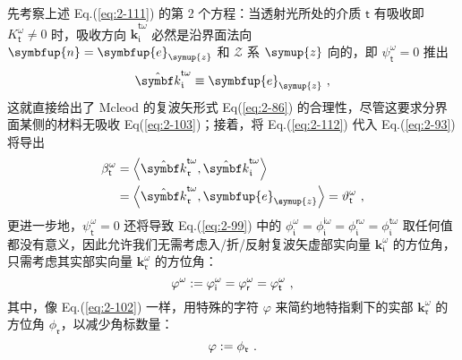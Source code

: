 先考察上述 Eq.(\ref{eq:2-111}) 的第 2 个方程：当透射光所处的介质 $\mathsf{t}$ 有吸收即 $K^{\omega}_{\mathsf{t}} \neq 0$ 时，吸收方向 $\hat{\symbf k}_{\mathfrak{i}}^{\mathsf{t}\omega}$ 必然是沿界面法向 $\symbfup{n} = \symbfup{e}_{\symup{z}}$ 和 $\mathcal{Z}$ 系 $\symup{z}$ 向的，即 $\psi^{\omega}_{\mathsf{t}} = 0$ 推出
\begin{equation} \label{eq:2-112}
	\abovedisplayskip=13pt
	\belowdisplayskip=13pt
	\hat{\symbf k}_{\mathfrak{i}}^{\mathsf{t}\omega} \equiv \symbfup{e}_{\symup{z}} ~,
\end{equation}
这就直接给出了 Mcleod 的复波矢形式 Eq(\ref{eq:2-86}) 的合理性，尽管这要求分界面某侧的材料无吸收 Eq(\ref{eq:2-103})；接着，将 Eq.(\ref{eq:2-112}) 代入 Eq.(\ref{eq:2-93}) 将导出
\begin{subequations} \label{eq:2-113}
\abovedisplayskip=6pt
\belowdisplayskip=6pt
\begin{align}
	\beta^\omega_{\mathsf{t}} &= \left< \hat{\symbf k}_{\mathfrak{r}}^{\mathsf{t}\omega}, \hat{\symbf k}_{\mathfrak{i}}^{\mathsf{t}\omega} \right> \label{eq:2-113a} \\ &= \left< \hat{\symbf k}_{\mathfrak{r}}^{\mathsf{t}\omega}, \symbfup{e}_{\symup{z}} \right> = \vartheta^{\omega}_{\mathsf{t}} \label{eq:2-113b}~,
\end{align}
\end{subequations}
更进一步地，$\psi^{\omega}_{\mathsf{t}} = 0$ 还将导致 Eq.(\ref{eq:2-99}) 中的 $\phi^{\omega}_{\mathfrak{i}} = \phi^{\mathsf{i}\omega}_{\mathfrak{i}} = \phi^{\mathsf{r}\omega}_{\mathfrak{i}} = \phi^{\mathsf{t}\omega}_{\mathfrak{i}}$ 取任何值都没有意义，因此允许我们无需考虑入/折/反射复波矢虚部实向量 ${\symbf k}_{\mathfrak{i}}^{\omega}$ 的方位角，只需考虑其实部实向量 ${\symbf k}_{\mathfrak{r}}^{\omega}$ 的方位角：
\begin{equation} \label{eq:2-114}
	\abovedisplayskip=10pt
	\belowdisplayskip=10pt
	\varphi^{\omega} := \varphi^{\omega}_{\mathsf{i}} = \varphi^{\omega}_{\mathsf{r}} = \varphi^{\omega}_{\mathsf{t}} ~,
\end{equation}
其中，像 Eq.(\ref{eq:2-102}) 一样，用特殊的字符 $\varphi$ 来简约地特指剩下的实部 ${\symbf k}_{\mathfrak{r}}^{\omega}$ 的方位角 $\phi_{\mathfrak{r}}$，以减少角标数量：
\begin{equation} \label{eq:2-115}
	\abovedisplayskip=8pt
	\belowdisplayskip=8pt
	\varphi := \phi_{\mathfrak{r}} ~.
\end{equation}

